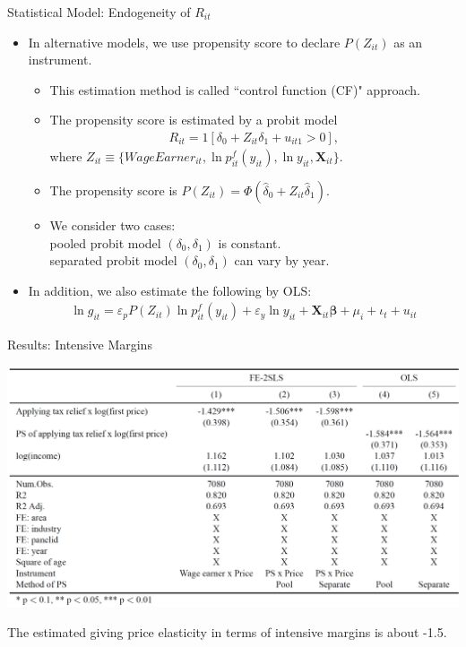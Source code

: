 \documentclass[dvipdfmx,10pt]{beamer}
\begin{document}
\begin{frame}{Statistical Model: Endogeneity of $R_{it}$}
	\begin{itemize}
		\item In alternative models, we use propensity score to declare $P(Z_{it})$ as an instrument.
		\begin{itemize}
			\item This estimation method is called ``control function (CF)" approach.
			\item The propensity score is estimated by a probit model
			\begin{align}
				R_{it}=1[\delta_0+Z_{it}\delta_1+u_{it1}>0]\tag{8},
			\end{align}
			where $Z_{it}\equiv \{WageEarner_{it}, \ln p_{it}^f(y_{it}), \ln y_{it}, \bm{X}_{it}\}$.
			\item The propensity score is $P(Z_{it})=\Phi(\hat{\delta}_0+Z_{it}\hat{\delta}_1)$.
			\item We consider two cases:\\
			  pooled probit model $(\delta_0, \delta_1)$ is constant.\\
			  separated probit model $(\delta_0, \delta_1)$ can vary by year.
		\end{itemize}
		\item In addition, we also estimate the following by OLS:
		\begin{align}
			\ln g_{it} = \varepsilon_pP(Z_{it})\ln p_{it}^f(y_{it}) + \varepsilon_y \ln y_{it} + \bm{X}_{it}\bm{\beta} + \mu_i + \iota_t + u_{it}\tag{9}
		\end{align}
	\end{itemize}
\end{frame}

\begin{frame}{Results: Intensive Margins}
	\begin{table}
		\centering
		\includegraphics[width=0.9\linewidth]{Tab_res_1}
		\caption{First-Price Elasticities (Intensive Margins)}
		\label{tab:2}
	\end{table}
The estimated giving price elasticity in terms of intensive margins is about -1.5.
\end{frame}
\end{document}

